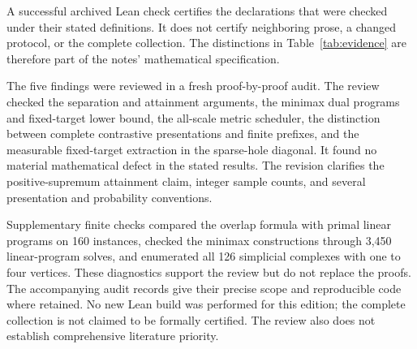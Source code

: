A successful archived Lean check certifies the declarations that were checked under their stated definitions. It does not certify neighboring prose, a changed protocol, or the complete collection. The distinctions in Table~\ref{tab:evidence} are therefore part of the notes' mathematical specification.

The five findings were reviewed in a fresh proof-by-proof audit. The review checked the separation and attainment arguments, the minimax dual programs and fixed-target lower bound, the all-scale metric scheduler, the distinction between complete contrastive presentations and finite prefixes, and the measurable fixed-target extraction in the sparse-hole diagonal. It found no material mathematical defect in the stated results. The revision clarifies the positive-supremum attainment claim, integer sample counts, and several presentation and probability conventions.

Supplementary finite checks compared the overlap formula with primal linear programs on 160 instances, checked the minimax constructions through 3,450 linear-program solves, and enumerated all 126 simplicial complexes with one to four vertices. These diagnostics support the review but do not replace the proofs. The accompanying audit records give their precise scope and reproducible code where retained. No new Lean build was performed for this edition; the complete collection is not claimed to be formally certified. The review also does not establish comprehensive literature priority.
